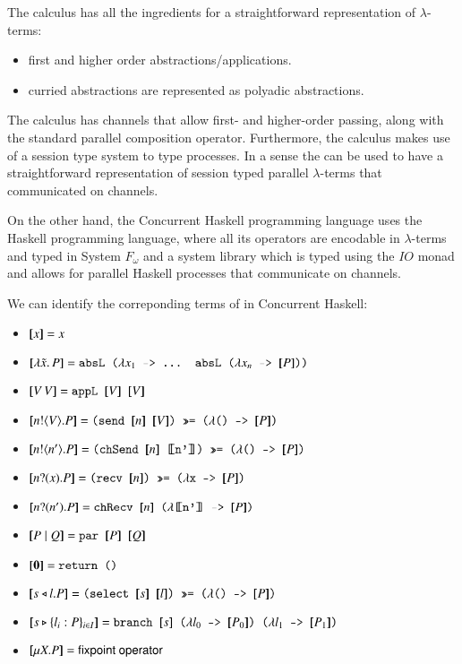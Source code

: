 \newcommand{\hask}[1]{\text{\fontfamily{cmtt}\selectfont #1}}

The \PHOpp calculus has all the ingredients for a straightforward
representation of $\lambda$-terms:
\begin{itemize}
	\item	first and higher order abstractions/applications.
	\item	curried abstractions are represented as polyadic abstractions.
\end{itemize}
The \PHOpp calculus has channels that allow first- and higher-order
passing, along with the standard parallel composition operator.
Furthermore, the calculus makes use of a session type system to
type processes.
In a sense the \PHOpp can be used to have a straightforward representation
of session typed parallel $\lambda$-terms that communicated on channels.

On the other hand, the Concurrent Haskell programming language uses the
Haskell programming language, where all its operators are encodable in
$\lambda$-terms and typed in System $F_{\omega}$ and a system
library which is typed using the $IO$ monad 
and allows for parallel Haskell processes that communicate on channels.

We can identify the correponding terms of \PHOpp in Concurrent Haskell:
\begin{itemize}
	\item	$[\!\![x]\!\!] = x$
	\item	$\map{\abs{\tilde{x}}{P}} = \hask{absL ($\lambda{}x_1$ -> ... absL ($\lambda{}x_n$  -> $\map{P}$))}$
	\item	$\map{\appl{V}{V}} = \hask{appL $\map{V}$ $\map{V}$}$
	\item	$\map{\bout{n}{V} P} = \hask{(send $\map{n}$ $\map{V}$) >>= ($\lambda$() -> $\map{P}$)}$
	\item	$\map{\bout{n}{n'} P} = \hask{(chSend $\map{n}$ \map{n'}) >>= ($\lambda$() -> $\map{P}$)}$
	\item	$\map{\binp{n}{x} P} = \hask{(recv $\map{n}$) >>= ($\lambda$x -> $\map{P}$)}$
	\item	$\map{\binp{n}{n'} P} = \hask{chRecv $\map{n}$ ($\lambda$\map{n'} -> $\map{P}$)}$
	\item	$\map{P\Par Q} = \hask{par $\map{P}$ $\map{Q}$}$
	\item	$\map{\inact} = \hask{return ()}$
	\item	$\map{\bsel{s}{l} P} = \hask{(select $\map{s}$ $\map{l}$) >>= ($\lambda$() -> $\map{P}$)}$
	\item	$\map{\bbra{s}{l_i: P}_{i \in I}} = \hask{branch $\map{s}$ ($\lambda{}l_0$ -> $\map{P_0}$) 
($\lambda{}l_1$ -> $\map{P_1}$)}$
	\item	$\map{\recp{X}{P}} = \mathsf{fixpoint\ operator}$
\end{itemize}

